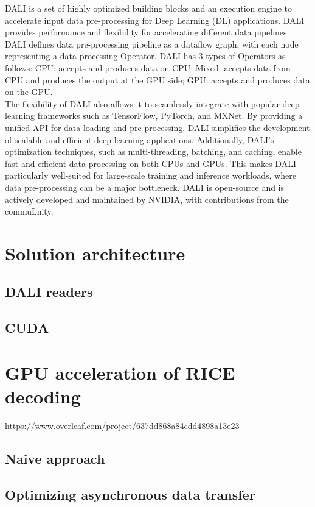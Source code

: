 \documentclass[licencjacka,en]{pracamgr}
\begin{document}
DALI is a set of highly optimized building blocks and an execution engine to accelerate input data pre-processing for Deep Learning (DL) applications. DALI provides performance and flexibility for accelerating different data pipelines. DALI defines data pre-processing pipeline as a dataflow graph, with each node representing a data processing Operator. DALI has 3 types of Operators as follows: CPU: accepts and produces data on CPU; Mixed: accepts data from CPU and produces the output at the GPU side; GPU: accepts and produces data on the GPU.\\

The flexibility of DALI also allows it to seamlessly integrate with popular deep learning frameworks such as TensorFlow, PyTorch, and MXNet. By providing a unified API for data loading and pre-processing, DALI simplifies the development of scalable and efficient deep learning applications. Additionally, DALI's optimization techniques, such as multi-threading, batching, and caching, enable fast and efficient data processing on both CPUs and GPUs. This makes DALI particularly well-suited for large-scale training and inference workloads, where data pre-processing can be a major bottleneck. DALI is open-source and is actively developed and maintained by NVIDIA, with contributions from the commuLnity.


\chapter{Solution architecture}
\section{DALI readers}
\section{CUDA}

\chapter{GPU acceleration of RICE decoding}https://www.overleaf.com/project/637dd868a84cdd4898a13e23
\section{Naive approach}
\section{Optimizing asynchronous data transfer}
\end{document}
